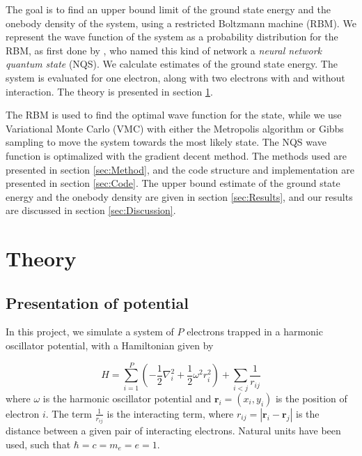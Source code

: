 \documentclass[norsk,a4paper,12pt]{article}
\begin{document}
The goal is to find an upper bound limit of the ground state energy and the onebody density of the system, using a restricted Boltzmann machine (RBM). We represent the wave function of the system as a probability distribution for the RBM, as first done by \cite{Carleo}, who named this kind of network a \emph{neural network quantum state} (NQS). We calculate estimates of the ground state energy. The system is evaluated for one electron, along with two electrons with and without interaction. The theory is presented in section \ref{sec:Theory}.
\par 
\vspace{3mm}

The RBM is used to find the optimal wave function for the state, while we use Variational Monte Carlo (VMC) with either the Metropolis algorithm or Gibbs sampling to move the system towards the most likely state. The NQS wave function is optimalized with the gradient decent method.  The methods used are presented in section \ref{sec:Method}, and the code structure and implementation are presented in section \ref{sec:Code}. The upper bound estimate of the ground state energy and the onebody density are given in section \ref{sec:Results}, and our results are discussed in section \ref{sec:Discussion}.


 


\section{Theory} \label{sec:Theory}
\subsection{Presentation of potential} \label{sec:Presentation_of_potential}
In this project, we simulate a system of $P$ electrons trapped in a harmonic oscillator potential, with a Hamiltonian given by

\begin{equation}
\label{eq:Hamiltonian}
\hat{H} = \sum_{i=1}^{P} (-\frac{1}{2} \nabla_i^2 + \frac{1}{2} \omega^2 r_i ^2) + \sum_{i<j} \frac{1}{r_{ij}} 
\end{equation}
where $\omega$ is the harmonic oscillator potential and  $\boldsymbol{r}_i = (x_i, y_i)$ is the position of electron $i$. The term $\frac{1}{r_{ij}}$ is the interacting term, where $r_{ij} = |\boldsymbol{r}_i - \boldsymbol{r}_j|$ is the distance between a given pair of interacting electrons. Natural units have been used, such that $\hbar = c = m_e = e = 1$.
\end{document}
